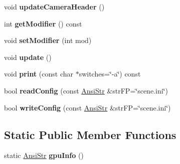 \begin{DoxyCompactItemize}
\item 
\hypertarget{classps_1_1scene_1_1SGEngine_a98938ae4a3660d3779b91de5ac69dfb2}{}void {\bfseries update\+Camera\+Header} ()\label{classps_1_1scene_1_1SGEngine_a98938ae4a3660d3779b91de5ac69dfb2}

\item 
\hypertarget{classps_1_1scene_1_1SGEngine_a01ae618ecac6f3c8660eea0fb87a569f}{}int {\bfseries get\+Modifier} () const \label{classps_1_1scene_1_1SGEngine_a01ae618ecac6f3c8660eea0fb87a569f}

\item 
\hypertarget{classps_1_1scene_1_1SGEngine_a84a25b3c33e833a4ceb6fc9cca9647ce}{}void {\bfseries set\+Modifier} (int mod)\label{classps_1_1scene_1_1SGEngine_a84a25b3c33e833a4ceb6fc9cca9647ce}

\item 
\hypertarget{classps_1_1scene_1_1SGEngine_a2c8afcaa8a8db5f1e25906f6dca9527c}{}void {\bfseries update} ()\label{classps_1_1scene_1_1SGEngine_a2c8afcaa8a8db5f1e25906f6dca9527c}

\item 
\hypertarget{classps_1_1scene_1_1SGEngine_a1a6a9721de238a77e10c9d5d33d9f1b9}{}void {\bfseries print} (const char $\ast$switches=\char`\"{}-\/a\char`\"{}) const \label{classps_1_1scene_1_1SGEngine_a1a6a9721de238a77e10c9d5d33d9f1b9}

\item 
\hypertarget{classps_1_1scene_1_1SGEngine_a136af6df6e8d344a00568f06e86e2aca}{}bool {\bfseries read\+Config} (const \hyperlink{classps_1_1base_1_1CAString}{Ansi\+Str} \&str\+F\+P=\char`\"{}scene.\+ini\char`\"{})\label{classps_1_1scene_1_1SGEngine_a136af6df6e8d344a00568f06e86e2aca}

\item 
\hypertarget{classps_1_1scene_1_1SGEngine_aa23b0bd8826593e4e07f71561055d99c}{}bool {\bfseries write\+Config} (const \hyperlink{classps_1_1base_1_1CAString}{Ansi\+Str} \&str\+F\+P=\char`\"{}scene.\+ini\char`\"{})\label{classps_1_1scene_1_1SGEngine_aa23b0bd8826593e4e07f71561055d99c}

\end{DoxyCompactItemize}
\subsection*{Static Public Member Functions}
\begin{DoxyCompactItemize}
\item 
\hypertarget{classps_1_1scene_1_1SGEngine_afaf6d1ca62e58fbb80b3d0d6acd7d0f1}{}static \hyperlink{classps_1_1base_1_1CAString}{Ansi\+Str} {\bfseries gpu\+Info} ()\label{classps_1_1scene_1_1SGEngine_afaf6d1ca62e58fbb80b3d0d6acd7d0f1}

\end{DoxyCompactItemize}
